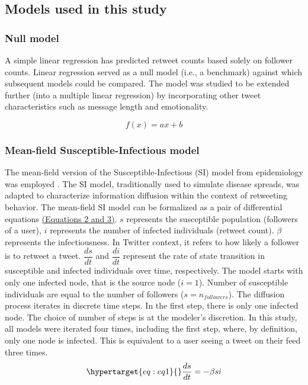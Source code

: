 \documentclass[11pt,a4paper]{article}
\begin{document}
    \subsection{Models used in this study}
        \subsubsection{Null model}
        A simple linear regression has predicted retweet counts based solely on follower counts. Linear regression served as a null model (i.e., a benchmark) against which subsequent models could be compared. The model was studied to be extended further (into a multiple linear regression) by incorporating other tweet characteristics such as message length and emotionality.
        
        \begin{equation}
            f(x) = ax + b
        \end{equation}
        
        \subsubsection{Mean-field Susceptible-Infectious model}
        The mean-field version of the Susceptible-Infectious (SI) model from epidemiology was employed \cite{downey_epidemiology_2022}. The SI model, traditionally used to simulate disease spreads, was adapted to characterize information diffusion within the context of retweeting behavior. The mean-field SI model can be formalized as a pair of differential equations \hyperlink{eq:eq1}{(Equations 2 and 3)}. $s$ represents the susceptible population (followers of a user), $i$ represents the number of infected individuals (retweet count). $\beta$ represents the infectiousness. In Twitter context, it refers to how likely a follower is to retweet a tweet. $\dfrac{ds}{dt}$ and $\dfrac{di}{dt}$ represent the rate of state transition in susceptible and infected individuals over time, respectively. The model starts with only one infected node, that is the source node ($i = 1$). Number of susceptible individuals are equal to the number of followers ($s = n_{followers}$). The diffusion process iterates in discrete time steps. In the first step, there is only one infected node. The choice of number of steps is at the modeler's discretion. In this study, all models were iterated four times, including the first step, where, by definition, only one node is infected. This is equivalent to a user seeing a tweet on their feed three times.
        \begin{equation}
            \hypertarget{eq:eq1}{}
            \frac{ds}{dt} = -\beta s i
        \end{equation}
    
\end{document}
